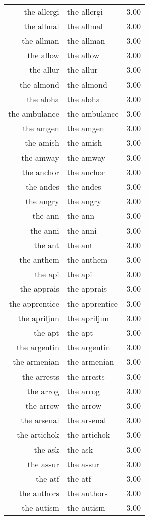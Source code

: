 \begin{table}[ht]
\begin{tabular}{rlr}
  the allergi & the allergi & 3.00 \\ 
  the allmal & the allmal & 3.00 \\ 
  the allman & the allman & 3.00 \\ 
  the allow & the allow & 3.00 \\ 
  the allur & the allur & 3.00 \\ 
  the almond & the almond & 3.00 \\ 
  the aloha & the aloha & 3.00 \\ 
  the ambulance & the ambulance & 3.00 \\ 
  the amgen & the amgen & 3.00 \\ 
  the amish & the amish & 3.00 \\ 
  the amway & the amway & 3.00 \\ 
  the anchor & the anchor & 3.00 \\ 
  the andes & the andes & 3.00 \\ 
  the angry & the angry & 3.00 \\ 
  the ann & the ann & 3.00 \\ 
  the anni & the anni & 3.00 \\ 
  the ant & the ant & 3.00 \\ 
  the anthem & the anthem & 3.00 \\ 
  the api & the api & 3.00 \\ 
  the apprais & the apprais & 3.00 \\ 
  the apprentice & the apprentice & 3.00 \\ 
  the apriljun & the apriljun & 3.00 \\ 
  the apt & the apt & 3.00 \\ 
  the argentin & the argentin & 3.00 \\ 
  the armenian & the armenian & 3.00 \\ 
  the arrests & the arrests & 3.00 \\ 
  the arrog & the arrog & 3.00 \\ 
  the arrow & the arrow & 3.00 \\ 
  the arsenal & the arsenal & 3.00 \\ 
  the artichok & the artichok & 3.00 \\ 
  the ask & the ask & 3.00 \\ 
  the assur & the assur & 3.00 \\ 
  the atf & the atf & 3.00 \\ 
  the authors & the authors & 3.00 \\ 
  the autism & the autism & 3.00 \\ 

\end{tabular}
\end{table}
